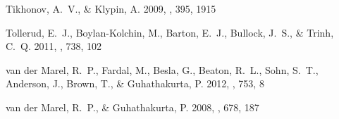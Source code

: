 \documentclass{emulateapj}
\begin{document}
\begin{thebibliography}{30}
{Tikhonov}, A.~V., \& {Klypin}, A. 2009, \mnras, 395, 1915

{Tollerud}, E.~J., {Boylan-Kolchin}, M., {Barton}, E.~J., {Bullock}, J.~S., \&
  {Trinh}, C.~Q. 2011, \apj, 738, 102

{van der Marel}, R.~P., {Fardal}, M., {Besla}, G., {Beaton}, R.~L., {Sohn},
  S.~T., {Anderson}, J., {Brown}, T., \& {Guhathakurta}, P. 2012, \apj, 753, 8

{van der Marel}, R.~P., \& {Guhathakurta}, P. 2008, \apj, 678, 187

\end{thebibliography}
\end{document}
